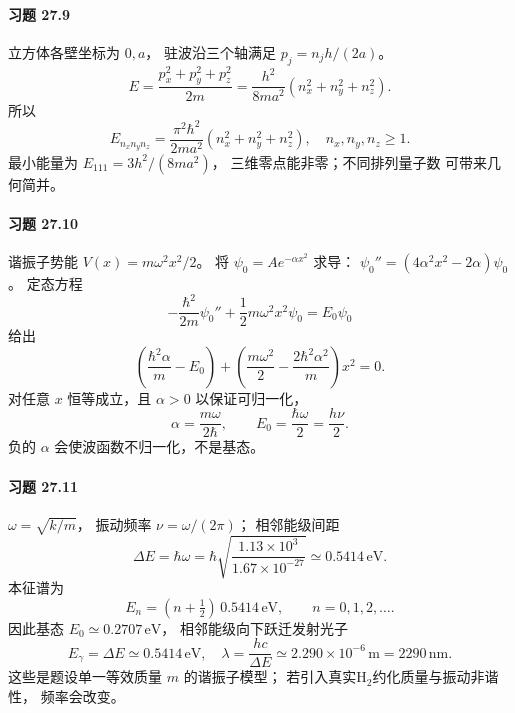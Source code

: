 \paragraph{习题 27.9}
立方体各壁坐标为 \(0,a\)，
驻波沿三个轴满足
\(p_j=n_jh/(2a)\)。
\[
E=\frac{p_x^2+p_y^2+p_z^2}{2m}
=\frac{h^2}{8ma^2}(n_x^2+n_y^2+n_z^2).
\]
所以
\[
\boxed{E_{n_xn_yn_z}
=\frac{\pi^2\hbar^2}{2ma^2}
(n_x^2+n_y^2+n_z^2)},
\quad n_x,n_y,n_z\ge1.
\]
最小能量为
\(\boxed{E_{111}=3h^2/(8ma^2)}\)，
三维零点能非零；不同排列量子数
可带来几何简并。

\paragraph{习题 27.10}
谐振子势能 \(V(x)=m\omega^2x^2/2\)。
将 \(\psi_0=Ae^{-\alpha x^2}\)
求导：
\(\psi_0''=(4\alpha^2x^2-2\alpha)\psi_0\)。
定态方程
\[
-\frac{\hbar^2}{2m}\psi_0''+
\frac12m\omega^2x^2\psi_0=E_0\psi_0
\]
给出
\[
\left(\frac{\hbar^2\alpha}{m}-E_0\right)
+\left(\frac{m\omega^2}2-
\frac{2\hbar^2\alpha^2}{m}\right)x^2=0.
\]
对任意 \(x\) 恒等成立，且
\(\alpha>0\) 以保证可归一化，
\[
\boxed{\alpha=\frac{m\omega}{2\hbar}},
\qquad
\boxed{E_0=\frac{\hbar\omega}{2}=\frac{h\nu}{2}}.
\]
负的 \(\alpha\) 会使波函数不归一化，不是基态。

\paragraph{习题 27.11}
\(\omega=\sqrt{k/m}\)，
振动频率 \(\nu=\omega/(2\pi)\)；
相邻能级间距
\[
\Delta E=\hbar\omega
=\hbar\sqrt{\frac{1.13\times10^3}{1.67\times10^{-27}}}
\simeq0.5414\,\mathrm{eV}.
\]
本征谱为
\[
\boxed{E_n=(n+\tfrac12)\,0.5414\,\mathrm{eV}},
\qquad n=0,1,2,\ldots .
\]
因此基态 \(E_0\simeq0.2707\,\mathrm{eV}\)，
相邻能级向下跃迁发射光子
\[
\boxed{E_\gamma=\Delta E\simeq0.5414\,\mathrm{eV}},
\quad
\boxed{\lambda=\frac{hc}{\Delta E}
\simeq2.290\times10^{-6}\,\mathrm m
=2290\,\mathrm{nm}}.
\]
这些是题设单一等效质量 \(m\) 的谐振子模型；
若引入真实H$_2$约化质量与振动非谐性，
频率会改变。
